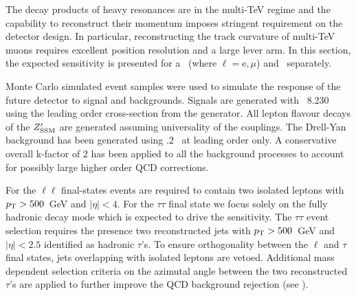 The decay products of heavy resonances are in the multi-TeV regime and the capability to reconstruct their momentum imposes stringent requirement on the detector design. In particular, reconstructing the track curvature of multi-TeV muons requires excellent position resolution and a large lever arm. In this section, the expected sensitivity is presented for a \Zpll\ (where $\ell=\mathrm{e},\mu$) and \Zptata\ separately.

Monte Carlo simulated event samples were used to simulate the response of the future detector to signal and backgrounds. Signals are generated with \pythia~8.230~\cite{Sjostrand:2014zea} using the leading order cross-section from the generator.
All lepton flavour decays of the $Z^{\prime}_{\mathrm{SSM}}$ are generated assuming universality of the couplings.
The Drell-Yan background has been generated using .2~\cite{Alwall:2014hca} at leading order only. A conservative overall k-factor of 2 has been applied to all the background processes to account for possibly large higher order QCD corrections.

For the $\ell\ell$ final-states events are required to contain two isolated leptons with $p_\text{T} > 500$~GeV and $|\eta|<4$. For the $\tau\tau$ final state we focus solely on the fully hadronic decay mode which is expected to drive the sensitivity. The $\tau\tau$ event selection requires the presence two reconstructed jets with $p_\text{T} > 500$~GeV and $|\eta|<2.5$ identified as hadronic $\tau$'s. To ensure orthogonality between the $\ell$ and $\tau$ final states, jets overlapping with isolated leptons are vetoed. Additional mass dependent selection criteria on the azimutal angle between the two reconstructed $\tau$'s are applied to further improve the QCD background rejection (see ).

